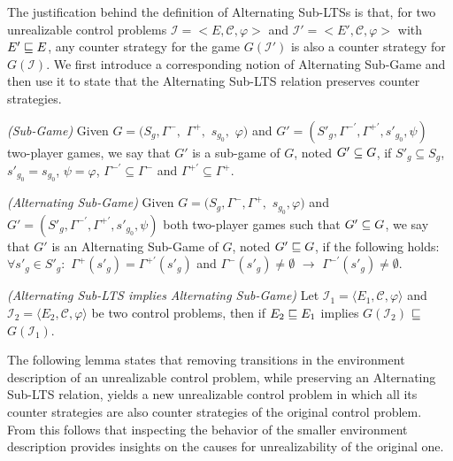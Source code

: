 The justification behind the definition of Alternating Sub-LTSs is that, for two unrealizable control problems $\mathcal{I} = <E, \mathcal{C}, \varphi>$ and $\mathcal{I'} = <E', \mathcal{C}, \varphi>$ with $E' \sqsubseteq E$, any counter strategy for the game $G(\mathcal{I'})$ is also a counter strategy for $G(\mathcal{I})$. We first introduce a corresponding notion of Alternating Sub-Game and then use it to state that the Alternating Sub-LTS relation preserves counter strategies.  

\begin{definition}\label{def:sub-game}\emph{(Sub-Game)}
Given $G = (S_g, \Gamma^{-},$ $\Gamma^{+},$ $s_{g_{0}}$$,$ $\varphi)$ and
$G' = (S'_g, \Gamma^{-\prime}, \Gamma^{+\prime},s'_{g_{0}}, \psi)$ two-player games, we say that $G'$ is a sub-game of $G$, noted
$G' \subseteq G$, if $S'_g \subseteq S_g$, $s'_{g_{0}}=s_{g_{0}}$, $\psi = \varphi$, $\Gamma^{-\prime}\subseteq \Gamma^{-}$ and
$\Gamma^{+\prime}\subseteq \Gamma^{+}$.
\end{definition}

\begin{definition}\label{def:alternating-sub-game}\emph{(Alternating Sub-Game)}
Given $G = (S_g, \Gamma^{-}, \Gamma^{+},$ $s_{g_{0}}, \varphi)$ and
$G' = (S'_g, \Gamma^{-\prime}, \Gamma^{+\prime},s'_{g_{0}}, \psi)$ both two-player games such that $G' \subseteq G$, we say that $G'$ is an Alternating Sub-Game of $G$, noted
$G'\sqsubseteq G$, if the following holds: $\forall s'_g \in S'_g:$ 
$\Gamma^{+}(s'_g)=\Gamma^{+\prime}(s'_g)$ and $\Gamma^{-}(s'_g)\neq \emptyset$ $\rightarrow$ $\Gamma^{-\prime}(s'_g) \neq \emptyset$. 
\end{definition}

\begin{lemma}\emph{(Alternating Sub-LTS implies Alternating Sub-Game)}\label{theorem:alternating-sub-game}
Let $\mathcal{I}_1 = \langle E_1, \mathcal{C}, \varphi \rangle$ and
$\mathcal{I}_2 = \langle E_2, \mathcal{C}, \varphi \rangle$ be two
control problems, then if $E_2 \sqsubseteq E_1$ implies $G(\mathcal{I}_2)$
$\sqsubseteq$ $G(\mathcal{I}_1)$.
\end{lemma}

%

The following lemma states that removing transitions in the environment description of an unrealizable control problem, while preserving an Alternating Sub-LTS relation, yields a new unrealizable control problem in which all its counter strategies are also counter strategies of the original control problem. From this follows that inspecting the behavior of the smaller environment description provides insights on the causes for unrealizability of the original one.  

